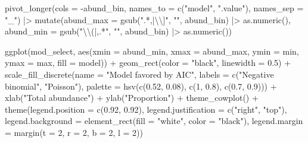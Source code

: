 \documentclass[
  letterpaper,
  DIV=11,
  numbers=noendperiod]{scrartcl}
\newenvironment{Shaded}{\begin{snugshade}}{\end{snugshade}}
\newcommand{\AttributeTok}[1]{\textcolor[rgb]{0.40,0.45,0.13}{#1}}
\newcommand{\DecValTok}[1]{\textcolor[rgb]{0.68,0.00,0.00}{#1}}
\newcommand{\FloatTok}[1]{\textcolor[rgb]{0.68,0.00,0.00}{#1}}
\newcommand{\FunctionTok}[1]{\textcolor[rgb]{0.28,0.35,0.67}{#1}}
\newcommand{\NormalTok}[1]{\textcolor[rgb]{0.00,0.23,0.31}{#1}}
\newcommand{\SpecialCharTok}[1]{\textcolor[rgb]{0.37,0.37,0.37}{#1}}
\newcommand{\StringTok}[1]{\textcolor[rgb]{0.13,0.47,0.30}{#1}}
\begin{document}
\begin{Shaded}
\begin{Highlighting}[]
    \FunctionTok{pivot\_longer}\NormalTok{(}\AttributeTok{cols =} \SpecialCharTok{{-}}\NormalTok{abund\_bin,}
                 \AttributeTok{names\_to =} \FunctionTok{c}\NormalTok{(}\StringTok{"model"}\NormalTok{, }\StringTok{".value"}\NormalTok{),}
                 \AttributeTok{names\_sep =} \StringTok{"\_"}\NormalTok{) }\SpecialCharTok{|\textgreater{}} 
    \FunctionTok{mutate}\NormalTok{(}\AttributeTok{abund\_max =} \FunctionTok{gsub}\NormalTok{(}\StringTok{".*,|}\SpecialCharTok{\textbackslash{}\textbackslash{}}\StringTok{]"}\NormalTok{, }\StringTok{""}\NormalTok{, abund\_bin) }\SpecialCharTok{|\textgreater{}}
               \FunctionTok{as.numeric}\NormalTok{(),}
           \AttributeTok{abund\_min =} \FunctionTok{gsub}\NormalTok{(}\StringTok{"}\SpecialCharTok{\textbackslash{}\textbackslash{}}\StringTok{(|,.*"}\NormalTok{, }\StringTok{""}\NormalTok{, abund\_bin) }\SpecialCharTok{|\textgreater{}}
               \FunctionTok{as.numeric}\NormalTok{())}

\FunctionTok{ggplot}\NormalTok{(mod\_select, }\FunctionTok{aes}\NormalTok{(}\AttributeTok{xmin =}\NormalTok{ abund\_min, }\AttributeTok{xmax =}\NormalTok{ abund\_max, }
                       \AttributeTok{ymin =}\NormalTok{ min, }\AttributeTok{ymax =}\NormalTok{ max, }\AttributeTok{fill =}\NormalTok{ model)) }\SpecialCharTok{+}
    \FunctionTok{geom\_rect}\NormalTok{(}\AttributeTok{color =} \StringTok{"black"}\NormalTok{, }\AttributeTok{linewidth =} \FloatTok{0.5}\NormalTok{) }\SpecialCharTok{+}
    \FunctionTok{scale\_fill\_discrete}\NormalTok{(}\AttributeTok{name =} \StringTok{"Model favored by AIC"}\NormalTok{, }
                        \AttributeTok{labels =} \FunctionTok{c}\NormalTok{(}\StringTok{"Negative binomial"}\NormalTok{, }\StringTok{"Poisson"}\NormalTok{),}
                        \AttributeTok{palette =} \FunctionTok{hsv}\NormalTok{(}\FunctionTok{c}\NormalTok{(}\FloatTok{0.52}\NormalTok{, }\FloatTok{0.08}\NormalTok{), }\FunctionTok{c}\NormalTok{(}\DecValTok{1}\NormalTok{, }\FloatTok{0.8}\NormalTok{), }\FunctionTok{c}\NormalTok{(}\FloatTok{0.7}\NormalTok{, }\FloatTok{0.9}\NormalTok{))) }\SpecialCharTok{+}
    \FunctionTok{xlab}\NormalTok{(}\StringTok{"Total abundance"}\NormalTok{) }\SpecialCharTok{+}
    \FunctionTok{ylab}\NormalTok{(}\StringTok{"Proportion"}\NormalTok{) }\SpecialCharTok{+}
    \FunctionTok{theme\_cowplot}\NormalTok{() }\SpecialCharTok{+}
    \FunctionTok{theme}\NormalTok{(}\AttributeTok{legend.position =} \FunctionTok{c}\NormalTok{(}\FloatTok{0.92}\NormalTok{, }\FloatTok{0.92}\NormalTok{),}
      \AttributeTok{legend.justification =} \FunctionTok{c}\NormalTok{(}\StringTok{"right"}\NormalTok{, }\StringTok{"top"}\NormalTok{), }
      \AttributeTok{legend.background =} \FunctionTok{element\_rect}\NormalTok{(}\AttributeTok{fill =} \StringTok{"white"}\NormalTok{, }\AttributeTok{color =} \StringTok{"black"}\NormalTok{), }
      \AttributeTok{legend.margin =} \FunctionTok{margin}\NormalTok{(}\AttributeTok{t =} \DecValTok{2}\NormalTok{, }\AttributeTok{r =} \DecValTok{2}\NormalTok{, }\AttributeTok{b =} \DecValTok{2}\NormalTok{, }\AttributeTok{l =} \DecValTok{2}\NormalTok{))}
\end{Highlighting}
\end{Shaded}
\end{document}
